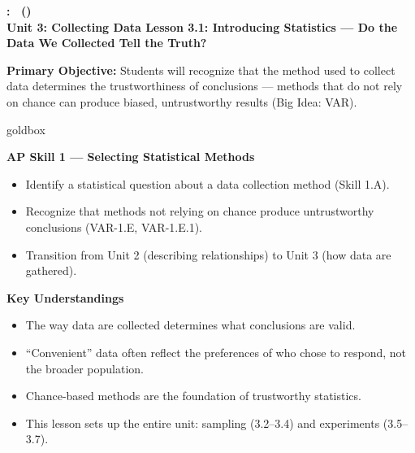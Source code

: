 \documentclass[10pt]{article}
\newcommand{\UnitNumberName}{Unit 3: Collecting Data \quad}
\newcommand{\LessonNumberName}{Lesson 3.1: Introducing Statistics --- Do the Data We Collected Tell the Truth?}
\begin{document}
\begin{center}
    {\Large\bfseries \CourseName: \SchoolYear\ (\MeetingLength) \\
    {\small\bfseries \UnitNumberName \LessonNumberName}}
\end{center}

\begin{tcolorbox}[colback=sky, colframe=navy, boxrule=0.9pt, arc=2mm,
    left=2mm, right=2mm, top=1.5mm, bottom=1.5mm]
    \textbf{Primary Objective:} Students will recognize that the method used to collect
    data determines the trustworthiness of conclusions --- methods that do not rely on
    chance can produce biased, untrustworthy results (Big Idea: VAR).
\end{tcolorbox}

\renewcommand{\arraystretch}{1.6}
\begin{skillbox}{goldbox}
\begin{minipage}[t]{0.48\linewidth}
    \textbf{AP Skill 1 --- Selecting Statistical Methods}
    \begin{itemize}
        \item Identify a statistical question about a data collection method (Skill 1.A).
        \item Recognize that methods not relying on chance produce untrustworthy
              conclusions (VAR-1.E, VAR-1.E.1).
        \item Transition from Unit 2 (describing relationships) to Unit 3 (how data
              are gathered).
    \end{itemize}
\end{minipage}
\hfill
\begin{minipage}[t]{0.48\linewidth}
    \textbf{Key Understandings}
    \begin{itemize}
        \item The way data are collected determines what conclusions are valid.
        \item ``Convenient'' data often reflect the preferences of who chose to respond,
              not the broader population.
        \item Chance-based methods are the foundation of trustworthy statistics.
        \item This lesson sets up the entire unit: sampling (3.2--3.4) and
              experiments (3.5--3.7).
    \end{itemize}
\end{minipage}
\end{skillbox}
\end{document}
